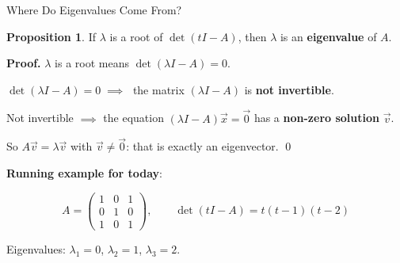 \documentclass[10pt]{beamer}
\theoremstyle{definition}
\newtheorem{prop}{Proposition}[section]
\newcommand{\x}[1]{\alert{\textbf{#1}}}
\begin{document}
%
\begin{frame}[shrink=5]{Where Do Eigenvalues Come From?}

\begin{prop}
If $\lambda$ is a root of $\det(tI - A)$, then $\lambda$ is an \x{eigenvalue} of $A$.
\end{prop}

\vfill

\textbf{Proof.}\; $\lambda$ is a root means $\det(\lambda I - A) = 0$.

\medskip

$\det(\lambda I - A) = 0 \;\implies\;$ the matrix $(\lambda I - A)$ is \x{not invertible}.

\medskip

Not invertible $\implies$ the equation $(\lambda I - A)\vec{x} = \vec{0}$ has a \x{non-zero solution} $\vec{v}$.

\medskip

So $A\vec{v} = \lambda\vec{v}$ with $\vec{v} \neq \vec{0}$: that is exactly an eigenvector. \;\qed

\vfill\pause

\textbf{Running example for today}:

$$A = \begin{pmatrix}1&0&1\\0&1&0\\1&0&1\end{pmatrix}, \qquad \det(tI - A) = t(t-1)(t-2)$$

\vfill

Eigenvalues: $\lambda_1 = 0$, $\lambda_2 = 1$, $\lambda_3 = 2$.

\end{frame}
\end{document}
